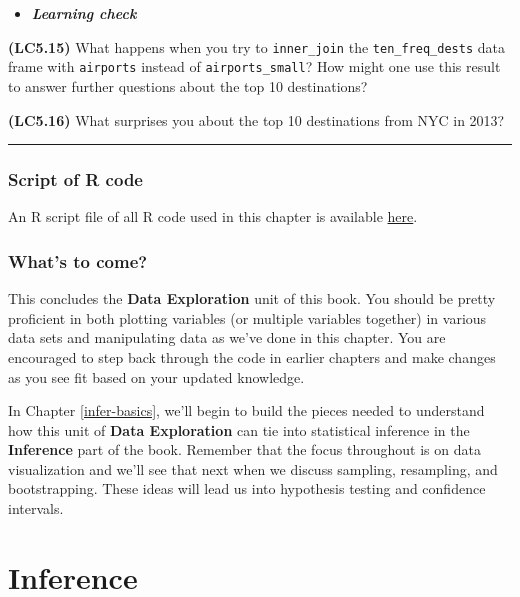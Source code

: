 \documentclass[]{tufte-book}
\let\oldrule=\rule
\renewcommand{\rule}[1]{\oldrule{\linewidth}}
\newenvironment{rmdblock}[1]
  {\begin{shaded*}
  \begin{itemize}
  \renewcommand{\labelitemi}{
    \raisebox{-.7\height}[0pt][0pt]{
    }
  }
  \item
  }
  {
  \end{itemize}
  \end{shaded*}
  }
\newenvironment{learncheck}
  {\begin{rmdblock}{warning}}
  {\end{rmdblock}}
\begin{document}
\begin{learncheck}
\textbf{\emph{Learning check}}
\end{learncheck}

\textbf{(LC5.15)} What happens when you try to \texttt{inner\_join} the
\texttt{ten\_freq\_dests} data frame with \texttt{airports} instead of
\texttt{airports\_small}? How might one use this result to answer
further questions about the top 10 destinations?

\textbf{(LC5.16)} What surprises you about the top 10 destinations from
NYC in 2013?

\begin{center}\rule{0.5\linewidth}{\linethickness}\end{center}

\section{Script of R code}\label{script-of-r-code-1}

An R script file of all R code used in this chapter is available
\href{http://ismayc.github.io/moderndiver-book/05-manipulating_data.R}{here}.

\section{What's to come?}\label{whats-to-come-2}

This concludes the \textbf{Data Exploration} unit of this book. You
should be pretty proficient in both plotting variables (or multiple
variables together) in various data sets and manipulating data as we've
done in this chapter. You are encouraged to step back through the code
in earlier chapters and make changes as you see fit based on your
updated knowledge.

In Chapter \ref{infer-basics}, we'll begin to build the pieces needed to
understand how this unit of \textbf{Data Exploration} can tie into
statistical inference in the \textbf{Inference} part of the book.
Remember that the focus throughout is on data visualization and we'll
see that next when we discuss sampling, resampling, and bootstrapping.
These ideas will lead us into hypothesis testing and confidence
intervals.

\part{Inference}\label{part-inference}
\end{document}
